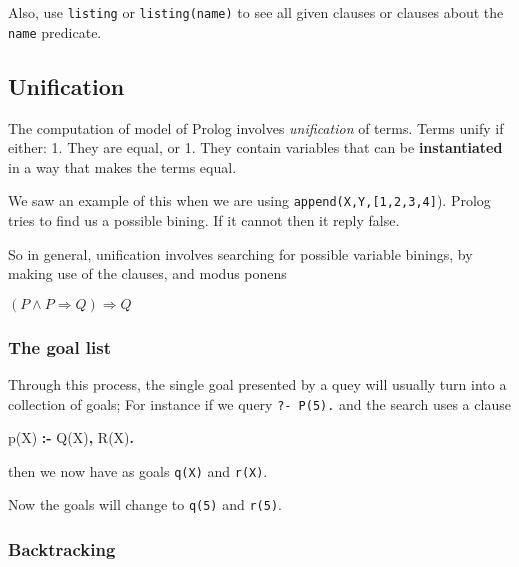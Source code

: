 \documentclass[11pt]{article}
\newenvironment{Shaded}{}{}
\newcommand{\KeywordTok}[1]{\textcolor[rgb]{0.00,0.44,0.13}{\textbf{{#1}}}}
\newcommand{\DataTypeTok}[1]{\textcolor[rgb]{0.56,0.13,0.00}{{#1}}}
\newcommand{\NormalTok}[1]{{#1}}
\begin{document}
    Also, use \texttt{listing} or \texttt{listing(name)} to see all given
clauses or clauses about the \texttt{name} predicate.

\hypertarget{unification}{%
\subsection{Unification}\label{unification}}

The computation of model of Prolog involves \emph{unification} of terms.
Terms unify if either: 1. They are equal, or 1. They contain variables
that can be \textbf{instantiated} in a way that makes the terms equal.

We saw an example of this when we are using
\texttt{append(X,Y,{[}1,2,3,4{]}}). Prolog tries to find us a possible
bining. If it cannot then it reply false.

So in general, unification involves searching for possible variable
binings, by making use of the clauses, and modus ponens

\((P \land P\Rightarrow Q) \Rightarrow Q\)

\hypertarget{the-goal-list}{%
\subsubsection{The goal list}\label{the-goal-list}}

Through this process, the single goal presented by a quey will usually
turn into a collection of goals; For instance if we query
\texttt{?-\ P(5).} and the search uses a clause

\begin{Shaded}
\begin{Highlighting}[]
\NormalTok{p(}\DataTypeTok{X}\NormalTok{) }\KeywordTok{:{-}} \DataTypeTok{Q}\NormalTok{(}\DataTypeTok{X}\NormalTok{)}\KeywordTok{,} \DataTypeTok{R}\NormalTok{(}\DataTypeTok{X}\NormalTok{)}\KeywordTok{.}
\end{Highlighting}
\end{Shaded}

then we now have as goals \texttt{q(X)} and \texttt{r(X)}.

Now the goals will change to \texttt{q(5)} and \texttt{r(5)}.

\hypertarget{backtracking}{%
\subsubsection{Backtracking}\label{backtracking}}
\end{document}
